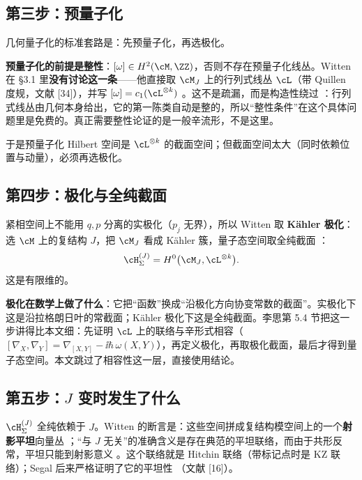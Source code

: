 \subsection{第三步：预量子化}

几何量子化的标准套路是：先预量子化，再选极化。

\textbf{预量子化的前提是整性}：$[\omega]\in H^2(\cM,\ZZ)$，否则不存在预量子化线丛。Witten 在 §3.1 里\textbf{没有讨论这一条}——他直接取 $\cM_J$ 上的行列式线丛 $\cL$（带 Quillen 度规，文献 [34]），并写 $[\omega]=c_1(\cL^{\otimes k})$ 。这不是疏漏，而是构造性绕过 \ours：行列式线丛由几何本身给出，它的第一陈类自动是整的，所以“整性条件”在这个具体问题里是免费的。真正需要整性论证的是一般辛流形，不是这里。

于是预量子化 Hilbert 空间是 $\cL^{\otimes k}$ 的截面空间；但截面空间太大（同时依赖位置与动量），必须再选极化。

\subsection{第四步：极化与全纯截面}

紧相空间上不能用 $q,p$ 分离的实极化（$p_j$ 无界），所以 Witten 取 \textbf{K\"ahler 极化}：选 $\cM$ 上的复结构 $J$，把 $\cM_J$ 看成 K\"ahler 簇，量子态空间取全纯截面 ：
\begin{equation}
\cH_\Sigma^{(J)}=H^0\bigl(\cM_J,\cL^{\otimes k}\bigr).
\label{eq:hilbert}
\end{equation}
这是有限维的。

\begin{keypoint}
\textbf{极化在数学上做了什么}：它把“函数”换成“沿极化方向协变常数的截面”。实极化下这是沿拉格朗日叶的常截面；K\"ahler 极化下这是全纯截面。李思第 5.4 节把这一步讲得比本文细：先证明 $\cL$ 上的联络与辛形式相容（$[\nabla_X,\nabla_Y]=\nabla_{[X,Y]}-\ii\hbar\,\omega(X,Y)$），再定义极化，再取极化截面，最后才得到量子态空间。本文跳过了相容性这一层，直接使用结论。
\end{keypoint}

\subsection{第五步：$J$ 变时发生了什么}

$\cH_\Sigma^{(J)}$ 全纯依赖于 $J$。Witten 的断言是：这些空间拼成复结构模空间上的一个\textbf{射影平坦}向量丛 ；“与 $J$ 无关”的准确含义是存在典范的平坦联络，而由于共形反常，平坦只能到射影意义 。这个联络就是 Hitchin 联络（带标记点时是 KZ 联络）；Segal 后来严格证明了它的平坦性 （文献 [16]）。

